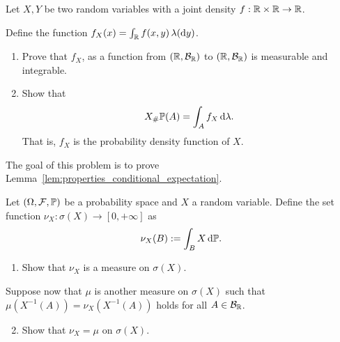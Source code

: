 \begin{problem}\label{prb:joint_pdfs}
Let $X,Y$ be two random variables with a joint density $f : \mathbb R \times \mathbb R \to \mathbb R$. 

Define the function $f_X(x) = \int_{\mathbb R} f(x,y) \, \lambda(\mathrm{d} y)$.
\begin{enumerate}[label={(\alph*)}]
\item Prove that $f_X$, as a function from $(\mathbb R, \mathcal B_{\mathbb R})$ to $(\mathbb R, \mathcal B_{\mathbb R})$ is measurable and integrable.
\item Show that
\[
	X_\# \mathbb P (A) = \int_A f_X \, \mathrm{d} \lambda.
\]
That is, $f_X$ is the probability density function of $X$.
\end{enumerate}
\end{problem}

%

\begin{problem}\label{prb:properties_conditional_expectation}
The goal of this problem is to prove Lemma~\ref{lem:properties_conditional_expectation}.
\end{problem}

\begin{problem}\label{prb:uniqueness_integration_measures}
Let $(\Omega, \mathcal F, \mathbb P)$ be a probability space and $X$ a random variable. Define the set function $\nu_X : \sigma(X) \to [0,+\infty]$ as
\[
	\nu_X(B) := \int_B X \, \mathrm{d} \mathbb P.
\]
\begin{enumerate}[label={(\alph*)}]
\item Show that $\nu_X$ is a measure on $\sigma(X)$.
\end{enumerate}

Suppose now that $\mu$ is another measure on $\sigma(X)$ such that $\mu(X^{-1}(A)) = \nu_X(X^{-1}(A))$ holds for all $A \in \mathcal B_{\mathbb R}$.
\begin{enumerate}[label={(\alph*)}]
\setcounter{enumi}{1}
\item Show that $\nu_X = \mu$ on $\sigma(X)$.
\end{enumerate}
\end{problem}

